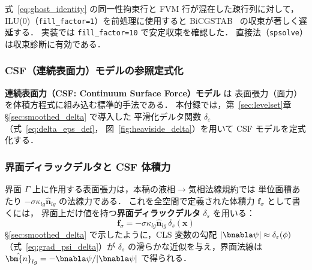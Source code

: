 \begin{tcolorbox}[warnbox, title={周期 FVM 行列と前処理：ILU の充填不足に注意}]
  式~\eqref{eq:ghost_identity} の同一性拘束行と FVM 行が混在した疎行列に対して，
  ILU(0)（\texttt{fill\_factor=1}）を前処理に使用すると BiCGSTAB~\cite{VanderVorst1992} の収束が著しく遅延する．
  実装では \texttt{fill\_factor=10} で安定収束を確認した．
  直接法（\texttt{spsolve}）は収束診断に有効である．
\end{tcolorbox}

\subsubsection{CSF（連続表面力）モデルの参照定式化}
\label{app:csf_full}

\textbf{連続表面力（CSF: Continuum Surface Force）モデル} \cite{Brackbill1992} は
表面張力（面力）を体積方程式に組み込む標準的手法である．
本付録では，第~\ref{sec:levelset}章§\ref{sec:smoothed_delta} で導入した
平滑化デルタ関数 $\delta_\varepsilon$（式~\eqref{eq:delta_eps_def}，
図~\ref{fig:heaviside_delta}）を用いて CSF モデルを定式化する．

\subsubsection{界面ディラックデルタと CSF 体積力}

界面 $\Gamma$ 上に作用する表面張力は，本稿の液相$\to$気相法線規約では
単位面積あたり $-\sigma\kappa_{lg}\hat{\bm{n}}_{lg}$ の法線力である．
これを全空間で定義された体積力 $\bm{f}_\sigma$ として書くには，
界面上だけ値を持つ\textbf{界面ディラックデルタ} $\delta_s$ を用いる：
\begin{equation}
  \bm{f}_\sigma = -\sigma\kappa_{lg}\hat{\bm{n}}_{lg}\,\delta_s(\bm{x})
  \label{eq:csf_dirac_app}
\end{equation}
§\ref{sec:smoothed_delta} で示したように，CLS 変数の勾配
$|\bnabla\psi| \approx \delta_\varepsilon(\phi)$（式~\eqref{eq:grad_psi_delta}）が
$\delta_s$ の滑らかな近似を与え，界面法線は
$\hat{\bm{n}}_{lg} = -\bnabla\psi/|\bnabla\psi|$ で得られる．

